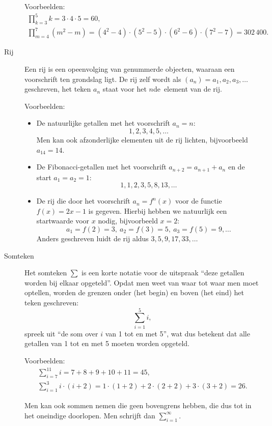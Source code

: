 \begin{description}
	Voorbeelden:
	\begin{gather*}
		\prod\limits_{k=3}^{5} k = 3 \cdot 4 \cdot 5 = 60,\\
		\prod\limits_{m=4}^{7} (m^2 - m) = (4^2 - 4) \cdot (5^2 - 5) \cdot (6^2 - 6) \cdot (7^2 - 7) = 302\,400.
	\end{gather*}

\clearpage

	\item[Rij] Een rij is een opeenvolging van genummerde objecten, waaraan een voorschrift ten grondslag ligt. De rij zelf wordt als $(a_n) = a_1,a_2,a_3,\dotsc$ geschreven, het teken $a_n$ staat voor het $n$de~ele\-ment van de rij.

	Voorbeelden:
	\begin{itemize}
		\item De natuurlijke getallen met het voorschrift $a_n = n$:
		\begin{equation*}
			1,2,3,4,5,\dotsc{}
		\end{equation*}
		Men kan ook afzonderlijke elementen uit de rij lichten, bij\-voorbeeld $a_{14} = 14$.

		\item De Fibonacci-getallen met het voorschrift $a_{n+2} = a_{n+1} + a_n$ en de start $a_1 = a_2 = 1$:
		\begin{equation*}
			1,1,2,3,5,8,13,\dotsc{}
		\end{equation*}

		\item De rij die door het voorschrift $a_n = f^n(x)$ voor de functie $f(x) = 2 x - 1$ is gegeven. Hierbij hebben we natuurlijk een startwaarde voor $x$ nodig, bijvoorbeeld $x = 2$:
		\begin{equation*}
			a_1 = f(2) = 3,\ a_2 = f(3) = 5,\ a_3 = f(5) = 9,\dotsc
		\end{equation*}
		Anders geschreven luidt de rij aldus $3,5,9,17,33,\dotsc{}$
	\end{itemize}

	\item[Somteken] Het somteken $\sum$ is een korte notatie voor de uitspraak ``deze getallen worden bij elkaar opgeteld''. Opdat men weet van waar tot waar men moet optellen, worden de grenzen onder (het begin) en boven (het eind) het teken geschreven:
	\begin{equation*}
		\sum\limits_{i=1}^{5} i,
	\end{equation*}
	spreek uit ``de som over $i$ van 1 tot en met 5'', wat dus betekent dat alle getallen van 1 tot en met 5 moeten worden opgeteld.

	Voorbeelden:
	\begin{gather*}
		\sum\limits_{i=7}^{11} i = 7 + 8 + 9 + 10 + 11 = 45,\\
		\sum\limits_{i=1}^{3} i \cdot (i + 2) = 1 \cdot (1 + 2) + 2 \cdot (2 + 2) + 3 \cdot (3 + 2) = 26.
	\end{gather*}

	Men kan ook sommen nemen die geen bovengrens hebben, die dus tot in het oneindige doorlopen. Men schrijft dan $\sum\limits_{i=1}^{\infty}$.

\end{description}

